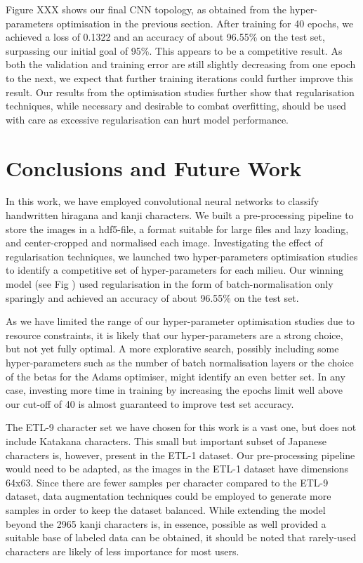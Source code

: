 \documentclass[british,12p]{article}
\begin{document}
    
    Figure XXX  shows our final CNN topology, as obtained from the hyper-parameters optimisation in the previous section. After training for 40 epochs, we achieved a loss of 0.1322 and an accuracy of about 96.55\% on the test set, surpassing our initial goal of 95\%. This appears to be a competitive result. As both the validation and training error are still slightly decreasing from one epoch to the next, we expect that further training iterations could further improve this result. Our results from the optimisation studies further show that regularisation techniques, while necessary and desirable to combat overfitting, should be used with care as excessive regularisation can hurt model performance. 
    
    \section{Conclusions and Future Work}
    In this work, we have employed convolutional neural networks to classify handwritten hiragana and kanji characters. We built a pre-processing pipeline to store the images in a hdf5-file, a format suitable for large files and lazy loading, and center-cropped and normalised each image. Investigating the effect of regularisation techniques, we launched two hyper-parameters optimisation studies to identify a competitive set of hyper-parameters for each milieu. Our winning model (see Fig ) used regularisation in the form of batch-normalisation only sparingly and achieved an accuracy of about 96.55\% on the test set. 
    
    As we have limited the range of our hyper-parameter optimisation studies due to resource constraints, it is likely that our hyper-parameters are a strong choice, but not yet fully optimal. A more explorative search, possibly including some hyper-parameters such as the number of batch normalisation layers or the choice of the betas for the Adams optimiser, might identify an even better set. In any case, investing more time in training by increasing the epochs limit well above our cut-off of 40 is almost guaranteed to improve test set accuracy. 
    
    The ETL-9 character set we have chosen for this work is a vast one, but does not include Katakana characters. This small but important subset of Japanese characters is, however, present in the ETL-1 dataset. Our pre-processing pipeline would need to be adapted, as the images in the ETL-1 dataset have dimensions 64x63. Since there are fewer samples per character compared to the ETL-9 dataset, data augmentation techniques could be employed to generate more samples in order to keep the dataset balanced. While extending the model beyond the 2965 kanji characters is, in essence, possible as well provided a suitable base of labeled data can be obtained, it should be noted that rarely-used characters are likely of less importance for most users.
    
\end{document}
